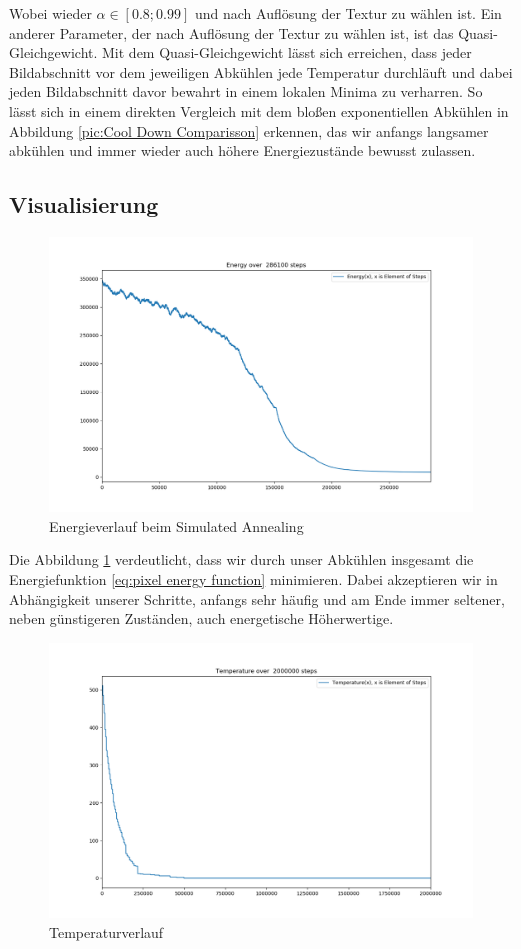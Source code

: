 Wobei wieder $\alpha \in [0.8; 0.99]$ und nach Auflösung der Textur zu wählen ist. Ein anderer Parameter, der nach 
Auflösung der Textur zu wählen ist, ist das Quasi-Gleichgewicht. Mit dem Quasi-Gleichgewicht lässt sich erreichen, 
dass jeder Bildabschnitt vor dem jeweiligen Abkühlen jede Temperatur durchläuft und dabei jeden Bildabschnitt davor 
bewahrt in einem lokalen Minima zu verharren.
So lässt sich in einem direkten Vergleich mit dem bloßen exponentiellen Abkühlen in Abbildung 
\ref{pic:Cool Down Comparisson} erkennen, das wir anfangs langsamer abkühlen und immer wieder auch 
höhere Energiezustände bewusst zulassen.
\vfill

\subsection{Visualisierung}

\begin{figure}[H]
    \centering
    \includegraphics[width=0.8\linewidth]{content/simulatedAnnealing/Bilder/Energy_286100_steps_KirkpatrickCooldownSchedule.png}
    \caption{Energieverlauf beim Simulated Annealing}
    \label{pic:kirkpatrick energie verlauf}
\end{figure}

Die Abbildung \ref{pic:kirkpatrick energie verlauf} verdeutlicht, dass wir durch unser Abkühlen insgesamt die 
Energiefunktion \ref{eq:pixel energy function} minimieren. Dabei akzeptieren wir in Abhängigkeit unserer Schritte,
anfangs sehr häufig und am Ende immer seltener, neben günstigeren Zuständen, auch energetische Höherwertige.

\begin{figure}[H]
    \centering
    \includegraphics[width=0.8\linewidth]{content/simulatedAnnealing/Bilder/Temperature.png}
    \caption{Temperaturverlauf}
    \label{pic:Temperaturverlauf kirkpatrick}
\end{figure}

